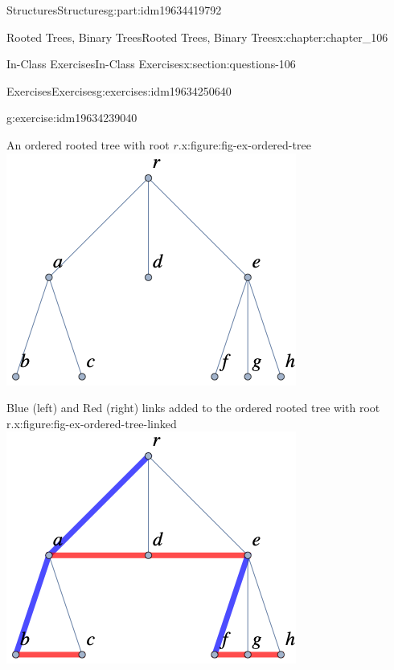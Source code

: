 \documentclass[oneside,10pt,]{book}
\numberwithin{equation}{section}
\begin{document}
\begin{partptx}{Structures}{}{Structures}{}{}{g:part:idm19634419792}
\begin{chapterptx}{Rooted Trees, Binary Trees}{}{Rooted Trees, Binary Trees}{}{}{x:chapter:chapter_106}
\begin{sectionptx}{In-Class Exercises}{}{In-Class Exercises}{}{}{x:section:questions-106}
\begin{exercises-subsection-numberless}{Exercises}{}{Exercises}{}{}{g:exercises:idm19634250640}
\begin{exercisegroup}
\begin{divisionexerciseeg}{5}{}{}{g:exercise:idm19634239040}
\begin{sidebyside}{2}{0}{0}{0}
\begin{sbspanel}{0.5}
\begin{figureptx}{An ordered rooted tree with root \(r\).}{x:figure:fig-ex-ordered-tree}{}
\includegraphics[width=\linewidth]{images/fig-ex-ordered-tree.png}
\tcblower
\end{figureptx}%
\end{sbspanel}%
\end{sidebyside}%
\begin{sidebyside}{2}{0}{0}{0}%
\begin{sbspanel}{0.5}%
\begin{figureptx}{Blue (left) and Red (right) links added to the ordered rooted tree with root r.}{x:figure:fig-ex-ordered-tree-linked}{}%
\includegraphics[width=\linewidth]{images/fig-ex-ordered-tree-linked.png}

\end{figureptx}
\end{sbspanel}
\end{sidebyside}
\end{divisionexerciseeg}
\end{exercisegroup}
\end{exercises-subsection-numberless}
\end{sectionptx}
\end{chapterptx}
\end{partptx}
\end{document}
